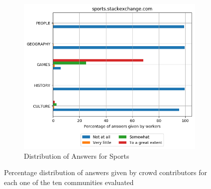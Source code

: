 \begin{figure}[H]
     \begin{subfigure}{0.5\textwidth}
    \centering
        \includegraphics[width=1\linewidth]{imgs/crowd-results/sports_stackexchange_com}
        \caption{Distribution of Answers for Sports}
        \label{fig:crowd-results-sports}
    \end{subfigure}%
 \caption{Percentage distribution of answers given by crowd contributors for each one of the ten communities evaluated }
    \label{fig:complete-crowd-distribution}
    
\end{figure}